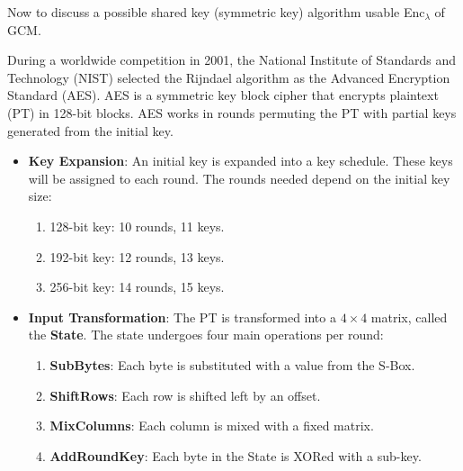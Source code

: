 \noindent
Now to discuss a possible shared key (symmetric key) algorithm usable Enc$_\lambda$ of GCM.
\begin{Def}

    \label{theo:aes}
    During a worldwide competition in 2001, the National Institute of Standards and Technology (NIST) selected the Rijndael algorithm as the Advanced Encryption Standard (AES).
    AES is a symmetric key block cipher that encrypts plaintext (PT) in 128-bit blocks. AES works in rounds permuting the PT with partial keys generated from the initial key.
    \begin{itemize}
        \item \textbf{Key Expansion}: An initial key is expanded into a key schedule. These keys will be assigned to each round. 
        The rounds needed depend on the initial key size:
        \begin{enumerate}
            \item 128-bit key: 10 rounds, 11 keys.
            \item 192-bit key: 12 rounds, 13 keys.
            \item 256-bit key: 14 rounds, 15 keys.
        \end{enumerate}
        \item \textbf{Input Transformation}: The PT is transformed into a $4\times4$ matrix, called the \textbf{State}. The 
        state undergoes four main operations per round:
        \begin{enumerate}
            \item \textbf{SubBytes}: Each byte is substituted with a value from the S-Box.
            \item \textbf{ShiftRows}: Each row is shifted left by an offset.
            \item \textbf{MixColumns}: Each column is mixed with a fixed matrix.
            \item \textbf{AddRoundKey}: Each byte in the State is XORed with a sub-key. \hfill \cite{satish2024aes} \cite{nist_aes2001} \cite{brainkartAES2018}
        \end{enumerate}
    \end{itemize}

    
\end{Def}

\newpage 

